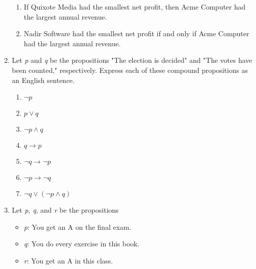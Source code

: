 \documentclass{article}
\begin{document}
\begin{enumerate}
\begin{enumerate}
                \item If Quixote Media had the smallest net profit, then Acme Computer had the largest annual revenue.
                \item Nadir Software had the smallest net profit if and only if Acme Computer had the largest annual revenue.
            \end{enumerate}
        \item Let \textit{p} and \textit{q} be the propositions "The election is decided" and "The votes have been counted," respectively. Express each of these compound propositions as an English sentence.
            \begin{enumerate}
                \item $\neg p$
                \item $p \vee q$
                \item $\neg p \wedge q$
                \item $q \rightarrow p$
                \item $\neg q \rightarrow \neg p$
                \item $\neg p \rightarrow \neg q$
                \item $\neg q \vee (\neg p \wedge q)$
            \end{enumerate}
        \item Let \textit{p, q}, and \textit{r} be the propositions
            \begin{itemize}
                \item \textit{p}: You get an A on the final exam.
                \item \textit{q}: You do every exercise in this book.
                \item \textit{r}: You get an A in this class.
            \end{itemize}


\end{enumerate}
\end{document}
